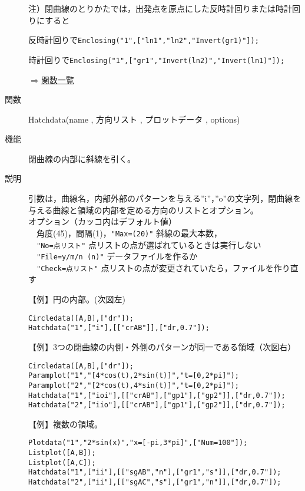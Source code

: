 \documentclass[papersize,a4paper,10pt,uplatex]{jsarticle}
\begin{document}
\begin{description}
\vspace{\baselineskip}
注）閉曲線のとりかたでは，出発点を原点にした反時計回りまたは時計回りにすると

反時計回りで\verb|Enclosing("1",["ln1","ln2","Invert(gr1)"]);|

時計回りで\verb|Enclosing("1",["gr1","Invert(ln2)","Invert(ln1)"]);|

\begin{flushright}\hyperlink{functionlist}{$\Rightarrow$関数一覧}\end{flushright}

\vspace{\baselineskip}
\hypertarget{hatchdata}{}
\item[関数]Hatchdata(name , 方向リスト , プロットデータ , options)
\item[機能]閉曲線の内部に斜線を引く。
\item[説明]引数は，曲線名，内部外部のパターンを与える''i''，''o''の文字列，閉曲線を与える曲線と領域の内部を定める方向のリストとオプション。\\
オプション（カッコ内はデフォルト値）\\
　角度(45)，間隔(1)，\verb|"Max=(20)"| 斜線の最大本数，\\
　\verb|"No=点リスト"| 点リストの点が選ばれているときは実行しない\\
　\verb|"File=y/m/n (n)"| データファイルを作るか\\
　\verb|"Check=点リスト"| 点リストの点が変更されていたら，ファイルを作り直す
 
\vspace{\baselineskip}
【例】円の内部。(次図左)
\begin{verbatim}
Circledata([A,B],["dr"]);
Hatchdata("1",["i"],[["crAB"]],["dr,0.7"]);
\end{verbatim}

【例】3つの閉曲線の内側・外側のパターンが同一である領域（次図右）
\begin{verbatim}
Circledata([A,B],["dr"]);
Paramplot("1","[4*cos(t),2*sin(t)]","t=[0,2*pi]");
Paramplot("2","[2*cos(t),4*sin(t)]","t=[0,2*pi]");
Hatchdata("1",["ioi"],[["crAB"],["gp1"],["gp2"]],["dr,0.7"]);
Hatchdata("2",["iio"],[["crAB"],["gp1"],["gp2"]],["dr,0.7"]);
\end{verbatim}
\vspace{\baselineskip}
\hspace{5mm}  \hspace{5mm}  

【例】複数の領域。
\begin{verbatim}
Plotdata("1","2*sin(x)","x=[-pi,3*pi]",["Num=100"]);
Listplot([A,B]);
Listplot([A,C]);
Hatchdata("1",["ii"],[["sgAB","n"],["gr1","s"]],["dr,0.7"]);
Hatchdata("2",["ii"],[["sgAC","s"],["gr1","n"]],["dr,0.7"]);
\end{verbatim}
\begin{center}
\begin{center}  \end{center}
\end{center}


\end{description}
\end{document}

